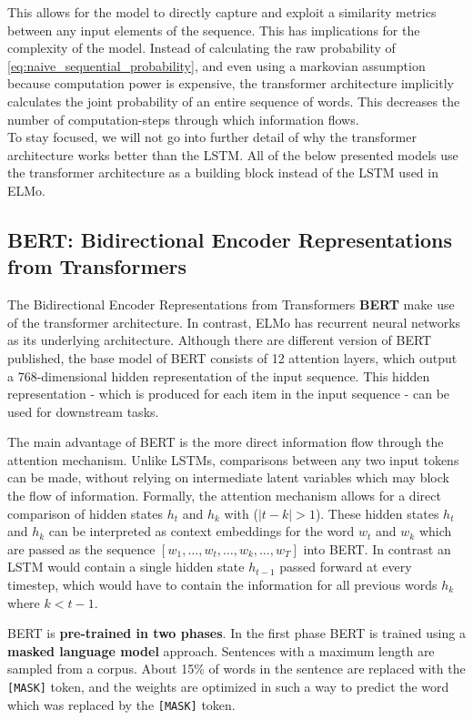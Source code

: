 \documentclass[a4paper,12pt,oneside,openright]{report}
\begin{document}
This allows for the model to directly capture and exploit a similarity metrics between any input elements of the sequence.
This has implications for the complexity of the model.
Instead of calculating the raw probability of \eqref{eq:naive_sequential_probability}, and even using a markovian assumption because computation power is expensive, the transformer architecture implicitly calculates the joint probability of an entire sequence of words.
This decreases the number of computation-steps through which information flows. \\

To stay focused, we will not go into further detail of why the transformer architecture works better than the LSTM.
All of the below presented models use the transformer architecture as a building block instead of the LSTM used in ELMo.

\subsection{BERT: Bidirectional Encoder Representations from Transformers}\label{section:BERT}
 
The Bidirectional Encoder Representations from Transformers \textbf{BERT} \cite{devlin18} make use of the transformer architecture.
In contrast, ELMo has recurrent neural networks as its underlying architecture.
Although there are different version of BERT published, the base model of BERT consists of 12 attention layers, which output a 768-dimensional hidden representation of the input sequence.
This hidden representation - which is produced for each item in the input sequence - can be used for downstream tasks.

The main advantage of BERT is the more direct information flow through the attention mechanism. 
Unlike LSTMs, comparisons between any two input tokens can be made, without relying on intermediate latent variables which may block the flow of information.
Formally, the attention mechanism allows for a direct comparison of hidden states $h_t$ and $h_k$ with ($|t - k| > 1$).
These hidden states $h_t$ and $h_k$ can be interpreted as context  embeddings for the word $w_t$ and $w_k$ which are passed as the sequence $[w_1, \ldots, w_t, \ldots, w_k, \ldots, w_T]$ into BERT.
In contrast  an LSTM would contain a single hidden state $h_{t-1}$ passed forward at every timestep, which would have to contain the information for all previous words $h_k$ where $k < t - 1$.

BERT is \textbf{pre-trained in two phases}. 
In the first phase BERT is trained using a \textbf{masked language model} approach. 
Sentences with a maximum length are sampled from a corpus.
About 15\% of words in the sentence are replaced with the \texttt{[MASK]} token, and the weights are optimized in such a way to predict the word which was replaced by the \Verb#[MASK]# token.
\end{document}
